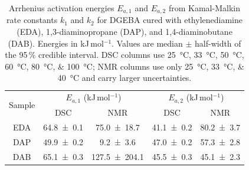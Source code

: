 \begin{table}[!ht]
\caption{Arrhenius activation energies $E_{a,1}$ and $E_{a,2}$ from Kamal-Malkin rate constants $k_1$ and $k_2$ for DGEBA cured with ethylenediamine (EDA), 1,3-diaminopropane (DAP), and 1,4-diaminobutane (DAB). Energies in kJ\,mol$^{-1}$. Values are median $\pm$ half-width of the 95\,\% credible interval. DSC columns use \qtylist[list-units=single]{25;33;50;60;80;100}{\celsius}; NMR columns use only \qtylist[list-units=single]{25;33;40}{\celsius} and carry larger uncertainties.}
\label{tab:Ea_only}
    \centering
    \begin{tabular}{c|cc|cc}
        \multirow{2}{*}{Sample} & \multicolumn{2}{c|}{$E_{a,1}$ (kJ\,mol$^{-1}$)} & \multicolumn{2}{c}{$E_{a,2}$ (kJ\,mol$^{-1}$)} \\
        & DSC & NMR & DSC & NMR \\ \midrule
        EDA & \num{64.8 \pm 0.1} & \num{75.0 \pm 18.7} & \num{41.1 \pm 0.2} & \num{80.2 \pm 3.7} \\ \midrule
        DAP & \num{49.9 \pm 0.2} & \num{9.2 \pm 3.6} & \num{47.0 \pm 0.2} & \num{57.3 \pm 2.8} \\ \midrule
        DAB & \num{65.1 \pm 0.3} & \num{127.5 \pm 204.1} & \num{45.5 \pm 0.3} & \num{45.1 \pm 2.3} \\
    \end{tabular}
\end{table}
